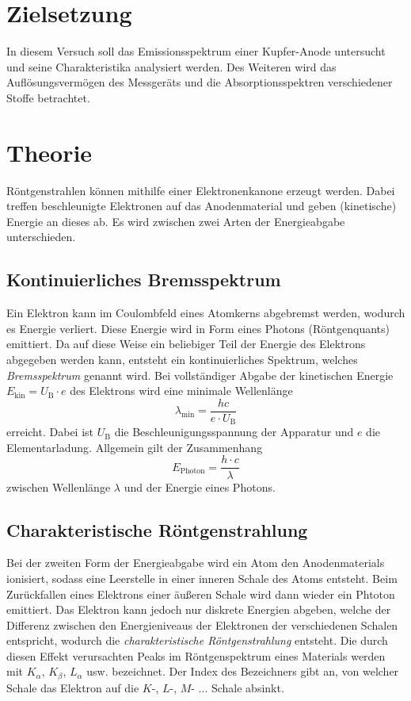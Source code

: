 \section{Zielsetzung}
\label{sec:Ziel}
In diesem Versuch soll das Emissionsspektrum einer Kupfer-Anode untersucht und seine Charakteristika analysiert werden. Des Weiteren wird das Auflösungsvermögen
des Messgeräts und die Absorptionsspektren verschiedener Stoffe betrachtet. 

\section{Theorie}
\label{sec:Theorie}
Röntgenstrahlen können mithilfe einer Elektronenkanone erzeugt werden. Dabei treffen beschleunigte Elektronen auf das Anodenmaterial und geben (kinetische)
Energie an dieses ab. Es wird zwischen zwei Arten der Energieabgabe unterschieden.

\subsection{Kontinuierliches Bremsspektrum}
\label{subsec:Bremsspektrum}
Ein Elektron kann im Coulombfeld eines Atomkerns abgebremst werden,
wodurch es Energie verliert. Diese Energie wird in Form eines Photons (Röntgenquants) emittiert. Da auf diese Weise ein beliebiger Teil der Energie des
Elektrons abgegeben werden kann, entsteht ein kontinuierliches Spektrum, welches \textit{Bremsspektrum} genannt wird.
Bei vollständiger Abgabe der kinetischen Energie $E_\text{kin} = U_\text{B} \cdot e$ des Elektrons wird eine minimale Wellenlänge
\begin{equation}
    \label{eqn:lambda_min}
    \lambda_\text{min} = \frac{h c}{e \cdot U_\text{B}}
\end{equation}
erreicht. Dabei ist $U_\text{B}$ die Beschleunigungsspannung der Apparatur und $e$ die Elementarladung. 
Allgemein gilt der Zusammenhang 
\begin{equation}
    \label{eqn:E_lambda}
    E_\text{Photon} = \frac{h \cdot c}{\lambda}
\end{equation}
zwischen Wellenlänge $\lambda$ und der Energie eines Photons.

\subsection{Charakteristische Röntgenstrahlung} 
\label{subsec:Bremsspektrum}
Bei der zweiten Form der Energieabgabe wird ein Atom den Anodenmaterials ionisiert, sodass eine Leerstelle in einer inneren Schale des Atoms entsteht. 
Beim Zurückfallen eines Elektrons einer äußeren Schale wird dann wieder ein Phtoton emittiert. Das Elektron kann jedoch nur diskrete Energien abgeben,
welche der Differenz zwischen den Energieniveaus der Elektronen der verschiedenen Schalen entspricht, wodurch die \textit{charakteristische Röntgenstrahlung}
entsteht. Die durch diesen Effekt verursachten Peaks im Röntgenspektrum eines Materials werden mit $K_\alpha$, $K_\beta$, $L_\alpha$ usw. bezeichnet.
Der Index des Bezeichners gibt an, von welcher Schale das Elektron auf die $K$-, $L$-, $M$- ... Schale absinkt.

